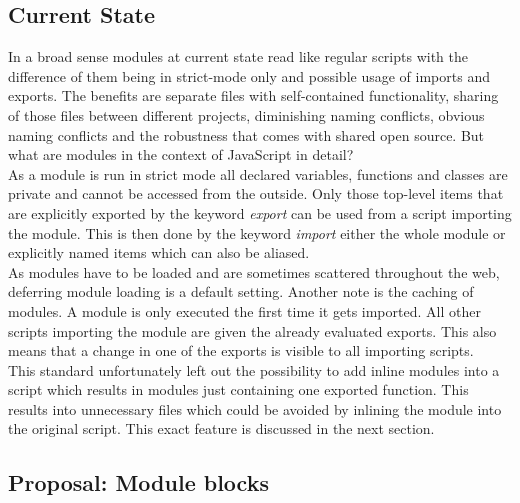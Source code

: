 \subsection{Current State}
In a broad sense modules at current state read like regular scripts with the difference of them being in strict-mode only and possible usage of imports and exports. The benefits are separate files with self-contained functionality, sharing of those files between different projects, diminishing naming conflicts, obvious naming conflicts and the robustness that comes with shared open source. But what are modules in the context of JavaScript in detail?\\
As a module is run in strict mode all declared variables, functions and classes are private and cannot be accessed from the outside. Only those top-level items that are explicitly exported by the keyword \emph{export} can be used from a script importing the module. This is then done by the keyword \emph{import} either the whole module or explicitly named items which can also be aliased.\\
As modules have to be loaded and are sometimes scattered throughout the web, deferring module loading is a default setting. Another note is the caching of modules. A module is only executed the first time it gets imported. All other scripts importing the module are given the already evaluated exports. This also means that a change in one of the exports is visible to all importing scripts.\\
This standard unfortunately left out the possibility to add inline modules into a script which results in modules just containing one exported function. This results into unnecessary files which could be avoided by inlining the module into the original script. This exact feature is discussed in the next section.

\subsection{Proposal: Module blocks}

